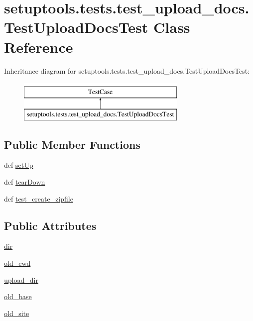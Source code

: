 \hypertarget{classsetuptools_1_1tests_1_1test__upload__docs_1_1TestUploadDocsTest}{}\section{setuptools.\+tests.\+test\+\_\+upload\+\_\+docs.\+Test\+Upload\+Docs\+Test Class Reference}
\label{classsetuptools_1_1tests_1_1test__upload__docs_1_1TestUploadDocsTest}
Inheritance diagram for setuptools.\+tests.\+test\+\_\+upload\+\_\+docs.\+Test\+Upload\+Docs\+Test\+:\begin{figure}[H]
\begin{center}
\leavevmode
\includegraphics[height=2.000000cm]{classsetuptools_1_1tests_1_1test__upload__docs_1_1TestUploadDocsTest}
\end{center}
\end{figure}
\subsection*{Public Member Functions}
\begin{DoxyCompactItemize}
\item 
def \hyperlink{classsetuptools_1_1tests_1_1test__upload__docs_1_1TestUploadDocsTest_a0ec0347d4bfcae13cdcb8180914fee00}{set\+Up}
\item 
def \hyperlink{classsetuptools_1_1tests_1_1test__upload__docs_1_1TestUploadDocsTest_a904f1e6ec2b93ef9718f4fdb51cfdbd1}{tear\+Down}
\item 
def \hyperlink{classsetuptools_1_1tests_1_1test__upload__docs_1_1TestUploadDocsTest_a4d94eecb6ea9e4d8ec200a04fc675e53}{test\+\_\+create\+\_\+zipfile}
\end{DoxyCompactItemize}
\subsection*{Public Attributes}
\begin{DoxyCompactItemize}
\item 
\hyperlink{classsetuptools_1_1tests_1_1test__upload__docs_1_1TestUploadDocsTest_a8f0b43e261ba0b119f08bd6ece499dcc}{dir}
\item 
\hyperlink{classsetuptools_1_1tests_1_1test__upload__docs_1_1TestUploadDocsTest_a1839f5fc2bd5065b4675959a625c118e}{old\+\_\+cwd}
\item 
\hyperlink{classsetuptools_1_1tests_1_1test__upload__docs_1_1TestUploadDocsTest_a1cdc19cd5c667ca4b0bb03ac68762f71}{upload\+\_\+dir}
\item 
\hyperlink{classsetuptools_1_1tests_1_1test__upload__docs_1_1TestUploadDocsTest_a26e3f4ae1c5f7f99f020ae2813944545}{old\+\_\+base}
\item 
\hyperlink{classsetuptools_1_1tests_1_1test__upload__docs_1_1TestUploadDocsTest_afc4cd9a32253d5b2620ccaf40abf5dbc}{old\+\_\+site}
\end{DoxyCompactItemize}


